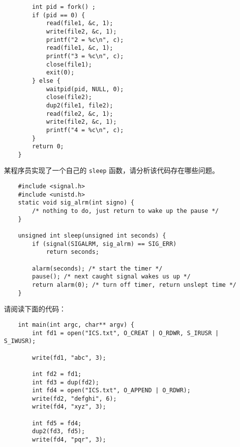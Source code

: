 \begin{problems}
\begin{verbatim}
        int pid = fork() ;
        if (pid == 0) {
            read(file1, &c, 1);
            write(file2, &c, 1);
            printf("2 = %c\n", c);
            read(file1, &c, 1);
            printf("3 = %c\n", c);
            close(file1);
            exit(0);
        } else {
            waitpid(pid, NULL, 0);
            close(file2);
            dup2(file1, file2);
            read(file2, &c, 1);
            write(file2, &c, 1);
            printf("4 = %c\n", c);
        }
        return 0;
    }
        \end{verbatim}
         某程序员实现了一个自己的 \verb|sleep| 函数，请分析该代码存在哪些问题。
        \begin{verbatim}
    #include <signal.h>
    #include <unistd.h>
    static void sig_alrm(int signo) {
        /* nothing to do, just return to wake up the pause */
    }

    unsigned int sleep(unsigned int seconds) {
        if (signal(SIGALRM, sig_alrm) == SIG_ERR)
            return seconds;

        alarm(seconds); /* start the timer */
        pause(); /* next caught signal wakes us up */
        return alarm(0); /* turn off timer, return unslept time */
    }
        \end{verbatim}
         请阅读下面的代码：
        \begin{verbatim}
    int main(int argc, char** argv) {
        int fd1 = open("ICS.txt", O_CREAT | O_RDWR, S_IRUSR | S_IWUSR);
        
        write(fd1, "abc", 3);

        int fd2 = fd1;
        int fd3 = dup(fd2);
        int fd4 = open("ICS.txt", O_APPEND | O_RDWR);
        write(fd2, "defghi", 6);
        write(fd4, "xyz", 3);

        int fd5 = fd4;
        dup2(fd3, fd5);
        write(fd4, "pqr", 3);


\end{verbatim}
\end{problems}

